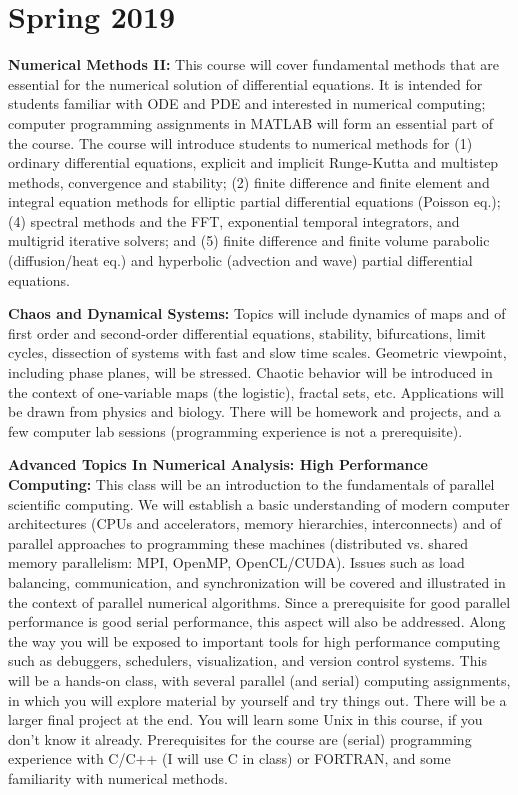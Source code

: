 \documentclass[11pt]{article}
\begin{document}
\section*{Spring 2019}

{\bf Numerical Methods II:} This course will cover fundamental methods that are
essential for the numerical solution of differential equations. It is intended
for students familiar with ODE and PDE and interested in numerical computing;
computer programming assignments in MATLAB will form an essential part of the
course. The course will introduce students to numerical methods for (1) ordinary
differential equations, explicit and implicit Runge-Kutta and multistep methods,
convergence and stability; (2) finite difference and finite element and integral
equation methods for elliptic partial differential equations (Poisson eq.); (4)
spectral methods and the FFT, exponential temporal integrators, and multigrid
iterative solvers; and (5) finite difference and finite volume parabolic
(diffusion/heat eq.) and hyperbolic (advection and wave) partial differential
equations.

{\bf Chaos and Dynamical Systems:} Topics will include dynamics of maps and of
first order and second-order differential equations, stability, bifurcations,
limit cycles, dissection of systems with fast and slow time scales.  Geometric
viewpoint, including phase planes, will be stressed. Chaotic behavior will be
introduced in the context of one-variable maps (the logistic), fractal sets,
etc. Applications will be drawn from physics and biology. There will be homework
and projects, and a few computer lab sessions (programming experience is not
a prerequisite).

{\bf Advanced Topics In Numerical Analysis: High Performance Computing:} This
class will be an introduction to the fundamentals of parallel scientific
computing. We will establish a basic understanding of modern computer
architectures (CPUs and accelerators, memory hierarchies, interconnects) and of
parallel approaches to programming these machines (distributed vs. shared memory
parallelism: MPI, OpenMP, OpenCL/CUDA). Issues such as load balancing,
communication, and synchronization will be covered and illustrated in the
context of parallel numerical algorithms. Since a prerequisite for good parallel
performance is good serial performance, this aspect will also be addressed.
Along the way you will be exposed to important tools for high performance
computing such as debuggers, schedulers, visualization, and version control
systems. This will be a hands-on class, with several parallel (and serial)
computing assignments, in which you will explore material by yourself and try
things out. There will be a larger final project at the end. You will learn some
Unix in this course, if you don't know it already. Prerequisites for the course
are (serial) programming experience with C/C++ (I will use C in class) or
FORTRAN, and some familiarity with numerical methods.
\end{document}
